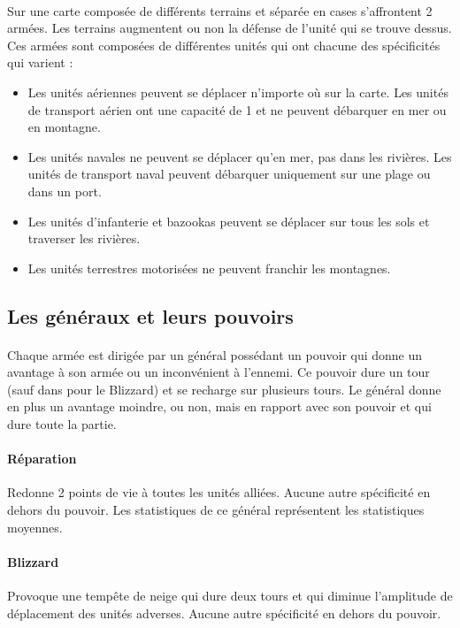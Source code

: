 \documentclass[12pt]{report}
\begin{document}
    \paragraph{}Sur une carte composée de différents terrains et séparée en cases s'affrontent 2 armées. Les terrains augmentent ou non la défense de l'unité qui se trouve dessus. Ces armées sont composées de différentes unités qui ont chacune des spécificités qui varient :
    \begin{itemize}
        \item Les unités aériennes peuvent se déplacer n'importe où sur la carte. Les unités de transport aérien ont une capacité de 1 et ne peuvent débarquer en mer ou en montagne.
        \item Les unités navales ne peuvent se déplacer qu'en mer, pas dans les rivières. Les unités de transport naval peuvent débarquer uniquement sur une plage ou dans un port.
        \item Les unités d'infanterie et bazookas peuvent se déplacer sur tous les sols et traverser les rivières.
        \item Les unités terrestres motorisées ne peuvent franchir les montagnes.
    \end{itemize}
    \subsection{Les généraux et leurs pouvoirs}
    \paragraph{}Chaque armée est dirigée par un général possédant un pouvoir qui donne un avantage à son armée ou un inconvénient à l'ennemi. Ce pouvoir dure un tour (sauf dans pour le Blizzard) et se recharge sur plusieurs tours. Le général donne en plus un avantage moindre, ou non, mais en rapport avec son pouvoir et qui dure toute la partie.
    
    
        \paragraph{Réparation}Redonne 2 points de vie à toutes les unités alliées. Aucune autre spécificité en dehors du pouvoir.
        Les statistiques de ce général représentent les statistiques moyennes.
        
        \paragraph{Blizzard}Provoque une tempête de neige qui dure deux tours et qui diminue l'amplitude de déplacement des unités adverses.
        Aucune autre spécificité en dehors du pouvoir.
        
\end{document}
